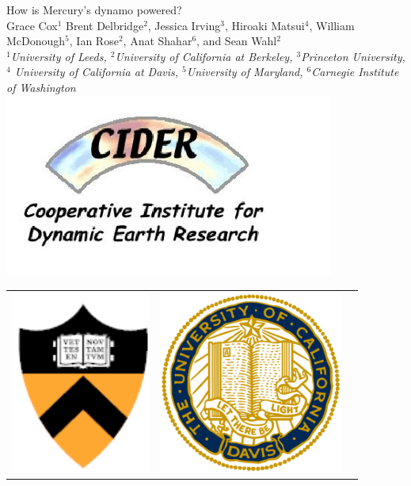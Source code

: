 \documentclass[landscape,a0b,final]{a0poster}
\begin{document}
\begin{center}
\begin{minipage}[c][9cm][c]{0.1\textwidth}
\begin{center}
\begin{tabular}{ccc}
    \end{tabular}
  \end{center}
\end{minipage}
\begin{minipage}[c][9cm][c]{0.78\textwidth}
  \begin{center}
    {\sc \Huge How is Mercury's dynamo powered?}\\[10mm]
    {\Large Grace Cox$^1$ Brent Delbridge$^2$, Jessica Irving$^3$, Hiroaki Matsui$^4$, William McDonough$^5$, Ian Rose$^2$, Anat Shahar$^6$, and Sean Wahl$^2$}\\[7.5mm]
    \emph{ $^1$University of Leeds, $^2$University of California at Berkeley, $^3$Princeton University, $^4$ University of California at Davis, $^5$University of Maryland, $^6$Carnegie Institute of Washington}\\[7.5mm]
    \includegraphics[height=6cm,angle=0]{logo_cider.jpg} 
  \end{center}
\end{minipage}
\hspace*{-9cm}
\begin{minipage}[c][9cm][c]{0.1\textwidth}
  \begin{center}
    \begin{tabular}{ccc}
    \includegraphics[height=6cm,angle=0]{princeton.png} &
    \includegraphics[height=6cm,angle=0]{davis.png} &

\end{tabular}
\end{center}
\end{minipage}
\end{center}
\end{document}
